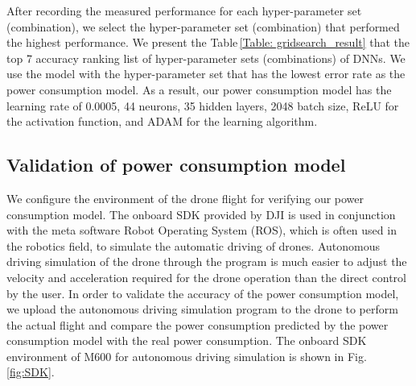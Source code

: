 \documentclass[journal]{./template/IEEEtran}
\begin{document}
After recording the measured performance for each hyper-parameter set (combination), we select the hyper-parameter set (combination) that performed the highest performance.
We present the Table\,\ref{Table: gridsearch_result} that the top 7 accuracy ranking list of hyper-parameter sets (combinations) of DNNs.
We use the model with the hyper-parameter set that has the lowest error rate as the power consumption model. 
As a result, our power consumption model has the learning rate of 0.0005, 44 neurons, 35 hidden layers, 2048 batch size, ReLU for the activation function, and ADAM for the learning algorithm. 

\begin{table}[ht]
\caption{The list of grid search results}
\label{Table: gridsearch_result}
\end{table}

\label{Section: Deep Neural networks (DNN)}


\subsection{Validation of power consumption model}

We configure the environment of the drone flight for verifying our power consumption model. 
The onboard SDK provided by DJI is used in conjunction with the meta software Robot Operating System (ROS), which is often used in the robotics field, to simulate the automatic driving of drones. 
Autonomous driving simulation of the drone through the program is much easier to adjust the velocity and acceleration required for the drone operation than the direct control by the user.
In order to validate the accuracy of the power consumption model, we upload the autonomous driving simulation program to the drone to perform the actual flight and compare the power consumption predicted by the power consumption model with the real power consumption. 
The onboard SDK environment of M600 for autonomous driving simulation is shown in Fig.\,\ref{fig:SDK}.
\end{document}
